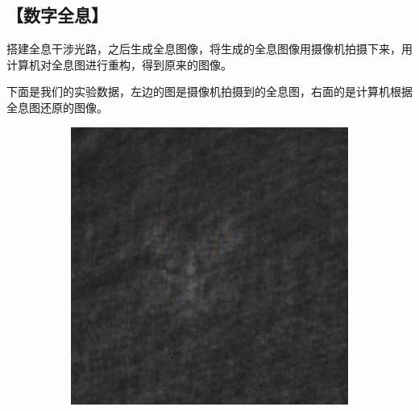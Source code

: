 \documentclass{ctexart}
\let\oldsubsection\subsection
\renewcommand{\subsection}[1]{\oldsubsection{\!\!\!\!\!\!【#1】}}
\begin{document}
\subsection{数字全息}

搭建全息干涉光路，之后生成全息图像，将生成的全息图像用摄像机拍摄下来，用计算机对全息图进行重构，得到原来的图像。

下面是我们的实验数据，左边的图是摄像机拍摄到的全息图，右面的是计算机根据全息图还原的图像。

\begin{figure}[H]
  \centering
  \begin{subfigure}{.48\textwidth}
    \includegraphics[width=\linewidth]{数字全息实验数据/数字全息/大1/大1.jpg}
  \end{subfigure}
  \begin{subfigure}{.48\textwidth}

\end{subfigure}
\end{figure}
\end{document}
